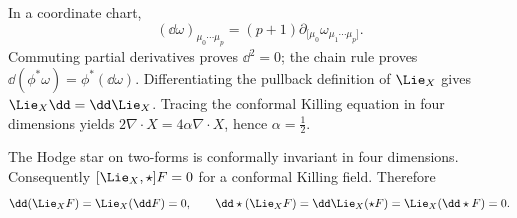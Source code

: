 \begin{solutions}
\begin{solution}
In a coordinate chart,
\[
(\dd\omega)_{\mu_0\cdots\mu_p}
=(p+1)\partial_{[\mu_0}\omega_{\mu_1\cdots\mu_p]}.
\]
Commuting partial derivatives proves \(\dd^2=0\); the chain rule proves
\(\dd(\phi^\ast\omega)=\phi^\ast(\dd\omega)\).  Differentiating the pullback
definition of \(\Lie_X\) gives
\(\Lie_X\dd=\dd\Lie_X\).  Tracing the conformal Killing equation in four
dimensions yields \(2\nabla\!\cdot X=4\alpha\nabla\!\cdot X\), hence
\(\alpha=\tfrac12\).

The Hodge star on two-forms is conformally invariant in four dimensions.
Consequently \([\Lie_X,\star]F=0\) for a conformal Killing field.  Therefore
\[
\dd(\Lie_XF)=\Lie_X(\dd F)=0,\qquad
\dd\star(\Lie_XF)=\dd\Lie_X(\star F)
=\Lie_X(\dd\star F)=0.
\]
\end{solution}



\end{solutions}

